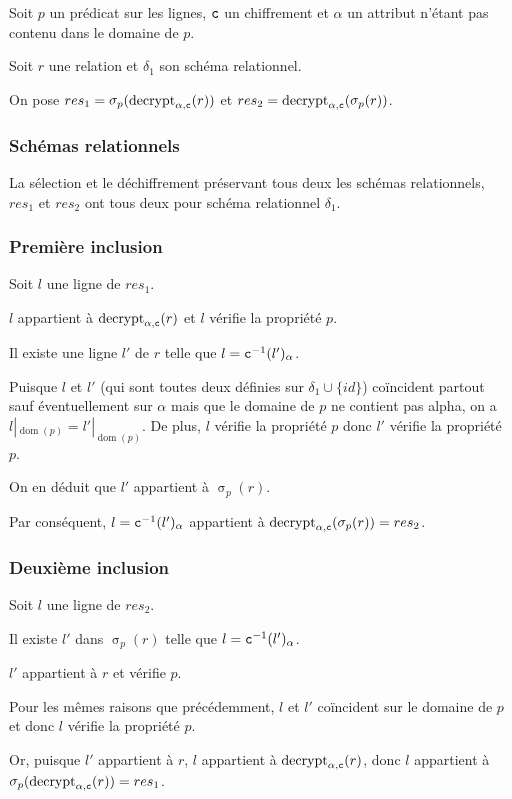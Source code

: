 \documentclass[french]{article}
\DeclareMathOperator{\sel}{\sigma}
\DeclareMathOperator{\decrypt}{decrypt}
\DeclareMathOperator{\dom}{dom}
\newcommand\typeT[1]{\text{\ttfamily #1}}
\newcommand{\decryptArgs}[2]{\decrypt_{#1 , \typeT{#2}}}
\newcommand{\selP}{\sel_p}
\newcommand{\decryptCAlpha}{\decryptArgs{\alpha}{c}}
\newcommand{\dc}[1]{\typeT{c}^{-1}(#1)}
\newcommand{\cip}{\cup \{id\}}
\begin{document}
Soit $p$ un prédicat sur les lignes,
$\typeT{c}$ un chiffrement et 
$\alpha$ un attribut n'étant pas contenu dans le domaine de $p$.

Soit $r$ une relation et $\delta_1$ son schéma relationnel.

On pose $res_1 = \selP(\decryptCAlpha(r))$
et $res_2 = \decryptCAlpha(\selP(r))$.

\subsubsection*{Schémas relationnels}
La sélection et le déchiffrement préservant tous deux les schémas relationnels,
$res_1$ et $res_2$ ont tous deux pour schéma relationnel
$\delta_1$.

\subsubsection*{Première inclusion}
Soit $l$ une ligne de $res_1$.

$l$ appartient à $\decryptCAlpha(r)$
et $l$ vérifie la propriété $p$.

Il existe une ligne $l'$ de $r$
telle que $l = \dc{l'}_\alpha$.

Puisque $l$ et $l'$ (qui sont toutes deux définies sur $\delta_1 \cip$)
coïncident partout sauf éventuellement sur $\alpha$ mais que le
domaine de $p$ ne contient pas alpha, on a
$l|_{\dom(p)} = l'|_{\dom(p)}$.
De plus, $l$ vérifie la propriété $p$ donc $l'$ vérifie la propriété $p$.

On en déduit que $l'$ appartient à $\selP(r)$.

Par conséquent, $l = \dc{l'}_\alpha$ appartient
à $\decryptCAlpha(\selP(r)) = res_2$.

\subsubsection*{Deuxième inclusion}
Soit $l$ une ligne de $res_2$.

Il existe $l'$ dans $\selP(r)$
telle que $l = \dc{l'}_\alpha$.

$l'$ appartient à $r$ et vérifie $p$.

Pour les mêmes raisons que précédemment,
$l$ et $l'$ coïncident sur le domaine de $p$
et donc $l$ vérifie la propriété $p$.

Or, puisque   $l'$ appartient à $r$,
$l$ appartient à $\decryptCAlpha(r)$,
donc $l$ appartient à $\selP(\decryptCAlpha(r)) = res_1$.
\end{document}
